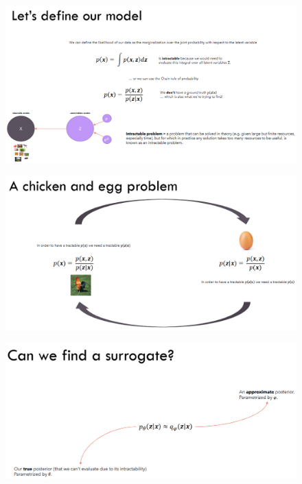 \documentclass{book}
\begin{document}
\begin{figure}[H]
    \centering
    \includegraphics[width=0.75\linewidth]{images/VAE_8.png}
\end{figure}

\begin{figure}[H]
    \centering
    \includegraphics[width=0.75\linewidth]{images/VAE_9.png}
\end{figure}

\begin{figure}[H]
    \centering
    \includegraphics[width=0.75\linewidth]{images/VAE_10.png}
\end{figure}
\end{document}
